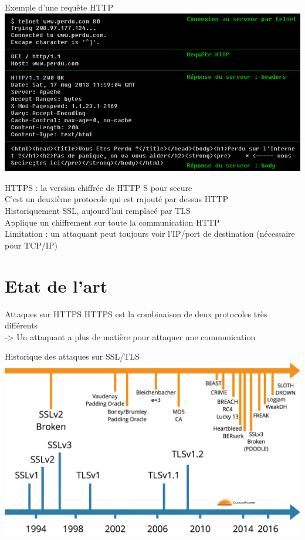 \documentclass{beamer}
\begin{document}
\begin{frame}{Exemple d'une requête HTTP}
    \includegraphics[scale=0.50]{../medias/perdu.png}
\end{frame}

\begin{frame}{HTTPS : la version chiffrée de HTTP}
    S pour secure \\
    C'est un deuxième protocole qui est rajouté par dessus HTTP \\
    Historiquement SSL, aujourd'hui remplacé par TLS \\
    Applique un chiffrement sur toute la communication HTTP \\

    Limitation : un attaquant peut toujours voir l'IP/port de destination (nécessaire pour TCP/IP)

\end{frame}

\section{Etat de l'art}

\begin{frame}{Attaques sur HTTPS}
    HTTPS est la combinaison de deux protocoles très différents \\
    -> Un attaquant a plus de matière pour attaquer une communication \\
    
\end{frame}

\begin{frame}{Historique des attaques sur SSL/TLS}
    \includegraphics[scale=0.19]{../medias/history-tls-attacks.png}
\end{frame}
\end{document}
